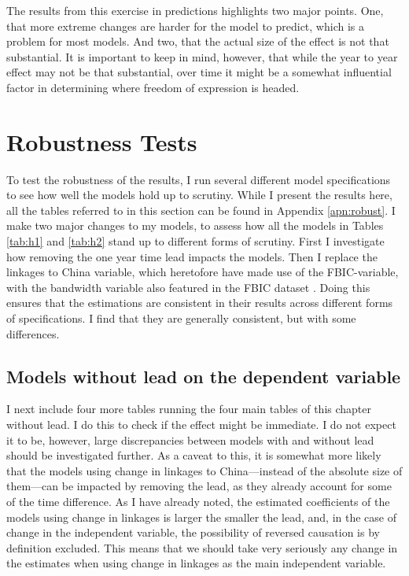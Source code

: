 The results from this exercise in predictions highlights two major points. One, that more extreme changes are harder for the model to predict, which is a problem for most models. And two, that the actual size of the effect is not that substantial. It is important to keep in mind, however, that while the year to year effect may not be that substantial, over time it might be a somewhat influential factor in determining where freedom of expression is headed.

\section{Robustness Tests} \label{sec:robust}
To test the robustness of the results, I run several different model specifications to see how well the models hold up to scrutiny. While I present the results here, all the tables referred to in this section can be found in Appendix \ref{apn:robust}. I make two major changes to my models, to assess how all the models in Tables \ref{tab:h1} and \ref{tab:h2} stand up to different forms of scrutiny. First I investigate how removing the one year time lead impacts the models. Then I replace the linkages to China variable, which heretofore have made use of the FBIC-variable, with the bandwidth variable also featured in the FBIC dataset \citep{moyer_china-us_2021}. Doing this ensures that the estimations are consistent in their results across different forms of specifications. I find that they are generally consistent, but with some differences.

\subsection{Models without lead on the dependent variable}
I next include four more tables running the four main tables of this chapter without lead. I do this to check if the effect might be immediate. I do not expect it to be, however, large discrepancies between models with and without lead should be investigated further. As a caveat to this, it is somewhat more likely that the models using change in linkages to China---instead of the absolute size of them---can be impacted by removing the lead, as they already account for some of the time difference. As I have already noted, the estimated coefficients of the models using change in linkages is larger the smaller the lead, and, in the case of change in the independent variable, the possibility of reversed causation is by definition excluded. This means that we should take very seriously any change in the estimates when using change in linkages as the main independent variable.

